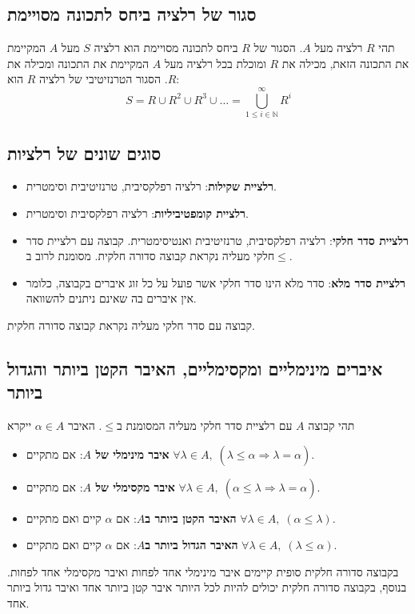 \documentclass[11pt, oneside]{article}
\newcommand{\opr}[1]{\underset{\text{#1}}{\Rightarrow}}
\newcommand{\mN}{\mathbb{N}}
\newcommand{\definition}[2]{\textbf{#1}: #2.}
\begin{document}
\subsection*{סגור של רלציה ביחס לתכונה מסויימת}
תהי $R$ רלציה מעל $A$. הסגור של $R$ ביחס לתכונה מסויימת הוא רלציה $S$ מעל $A$ המקיימת את התכונה הזאת, מכילה את $R$ ומוכלת בכל רלציה מעל $A$ המקיימת את התכונה ומכילה את $R$. הסגור הטרנזיטיבי של רלציה $R$ הוא:
\[
S = R \cup R^{2} \cup R^{3} \cup \dots = \bigcup^{\infty}_{1 \le i \in \mN} R^{i}
\]

\subsection*{סוגים שונים של רלציות}
\begin{itemize}
\item \definition{רלציית שקילות}{רלציה רפלקסיבית, טרנזיטיבית וסימטרית}
\item \definition{רלציית קומפטיביליות}{רלציה רפלקסיבית וסימטרית}
\item \definition{רלציית סדר חלקי}{רלציה רפלקסיבית, טרנזיטיבית ואנטיסימטרית. קבוצה עם רלציית סדר חלקי מעליה נקראת קבוצה סדורה חלקית. מסומנת לרוב ב$\le$}
\item \definition{רלציית סדר מלא}{סדר מלא הינו סדר חלקי אשר פועל על כל זוג איברים בקבוצה, כלומר אין איברים בה שאינם ניתנים להשוואה}
\end{itemize}
קבוצה עם סדר חלקי מעליה נקראת קבוצה סדורה חלקית.

\subsection*{איברים מינימליים ומקסימליים, האיבר הקטן ביותר והגדול ביותר}
תהי קבוצה $A$ עם רלציית סדר חלקי מעליה המסומנת ב$\le$. האיבר $\alpha \in A$ ייקרא
\begin{itemize}
\item \definition{איבר מינימלי של $A$}{אם מתקיים $\forall \lambda \in A,\;(\lambda \le \alpha \opr{} \lambda = \alpha)$}
\item \definition{איבר מקסימלי של $A$}{אם מתקיים $\forall \lambda \in A,\;(\alpha \le \lambda \opr{} \lambda = \alpha)$}
\item \definition{האיבר הקטן ביותר ב$A$}{אם $\alpha$ קיים ואם מתקיים $\forall \lambda \in A,\;(\alpha \le \lambda)$}
\item \definition{האיבר הגדול ביותר ב$A$}{אם $\alpha$ קיים ואם מתקיים $\forall \lambda \in A,\;(\lambda \le \alpha)$}
\end{itemize}
בקבוצה סדורה חלקית סופית קיימים איבר מינימלי אחד לפחות ואיבר מקסימלי אחד לפחות. בנוסף, בקבוצה סדורה חלקית יכולים להיות לכל היותר איבר קטן ביותר אחד ואיבר גדול ביותר אחד.
\end{document}
